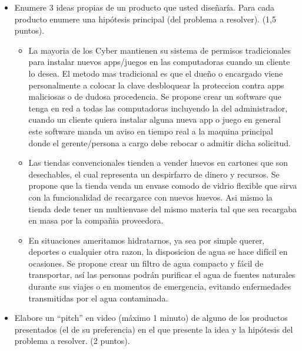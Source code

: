 \documentclass[a4paper,12pt]{article}
\begin{document}
\begin{itemize}
\item Enumere 3 ideas propias de un producto que usted diseñaría. Para cada producto enumere una hipótesis principal (del problema a resolver). (1,5 puntos).

\begin{itemize}
\item La mayoria de los Cyber mantienen su sistema de permisos tradicionales para instalar nuevos apps/juegos en las computadoras cuando un cliente lo desea. El metodo mas tradicional es que el dueño o encargado viene personalmente a colocar la clave desbloquear la proteccion contra apps maliciosas o de dudosa procedencia. Se propone crear un software que tenga en red a todas las computadoras incluyendo la del administrador, cuando un cliente quiera instalar alguna nueva app o juego en general este software manda un aviso en tiempo real a la maquina principal donde el gerente/persona a cargo debe rebocar o admitir dicha solicitud.
\item Las tiendas convencionales tienden a vender huevos en cartones que son desechables, el cual representa un despirfarro de dinero y recursos. Se propone que la tienda venda un envase comodo de vidrio flexible que sirva con la funcionalidad de recargarce con nuevos huevos. Asi mismo la tienda dede tener un multienvase del mismo materia tal que sea recargaba en masa por la compañia proveedora. 
\item En situaciones ameritamos hidratarnos, ya sea por simple querer, deportes o cualquier otra razon, la disposicion de agua se hace difícil en ocasiones. Se propone crear un filtro de agua compacto y fácil de transportar, así las personas podrán purificar el agua de fuentes naturales durante sus viajes o en momentos de emergencia, evitando enfermedades transmitidas por el agua contaminada.
\end{itemize}

\item Elabore un “pitch” en video (máximo 1 minuto) de alguno de los productos presentados (el de su preferencia) en el que presente la idea y la hipótesis del problema a resolver. (2 puntos).

\end{itemize}
\end{document}
